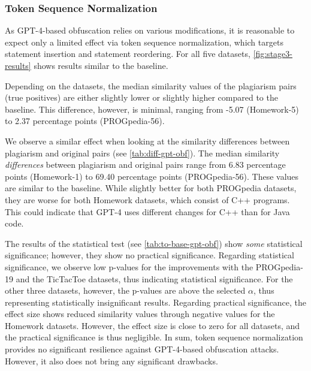 \subsubsection{Token Sequence Normalization}

As GPT-4-based obfuscation relies on various modifications, it is reasonable to expect only a limited effect via token sequence normalization, which targets statement insertion and statement reordering. For all five datasets, \autoref{fig:stage3-results} shows results similar to the baseline.

Depending on the datasets, the median similarity values of the plagiarism pairs (true positives) are either slightly lower or slightly higher compared to the baseline. This difference, however, is minimal, ranging from -5.07 (Homework-5) to 2.37 percentage points (PROGpedia-56). 

We observe a similar effect when looking at the similarity differences between plagiarism and original pairs (see \autoref{tab:diff-gpt-obf}).
The median similarity \textit{differences} between plagiarism and original pairs range from 6.83 percentage points (Homework-1) to 69.40 percentage points (PROGpedia-56).
These values are similar to the baseline. While slightly better for both PROGpedia datasets, they are worse for both Homework datasets, which consist of C++ programs. This could indicate that GPT-4 uses different changes for C++ than for Java code.

The results of the statistical test (see \autoref{tab:to-base-gpt-obf}) show \textit{some} statistical significance; however, they show no practical significance.
Regarding statistical significance, we observe low p-values for the improvements with the PROGpedia-19 and the TicTacToe datasets, thus indicating statistical significance.
For the other three datasets, however, the p-values are above the selected $\alpha$, thus representing statistically insignificant results.
Regarding practical significance, the effect size shows reduced similarity values through negative values for the Homework datasets. However, the effect size is close to zero for all datasets, and the practical significance is thus negligible.
In sum, token sequence normalization provides no significant resilience against GPT-4-based obfuscation attacks. However, it also does not bring any significant drawbacks.


